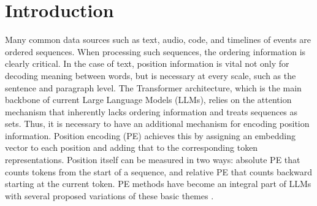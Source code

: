 \documentclass{article}
\begin{document}
\section{Introduction}
Many common data sources such as text, audio, code, and timelines of events are ordered sequences.
When processing such sequences, the ordering information is clearly critical.
In the case of text,
position information is vital not only for decoding meaning between words, but is necessary at every scale, such as the sentence and paragraph level.
%
%
 The Transformer architecture, which is the main backbone of current Large Language Models (LLMs), 
 relies on the attention mechanism \citep{Bahdanau2014NeuralMT} that inherently lacks ordering information and treats sequences as sets.
%
Thus, it is necessary to have an additional mechanism for encoding position information.
Position encoding (PE) \citep{collobert2008unified,Sukhbaatar2015EndToEndMN} achieves this by assigning an embedding vector to each position and adding that to the corresponding token representations.
Position itself can be measured in two ways: absolute PE that counts tokens from the start of a sequence, and relative PE that counts backward starting at the current token.
PE methods have become an integral part of LLMs with
 several proposed variations of these basic themes \citep{dufter2022position}. %


\end{document}
